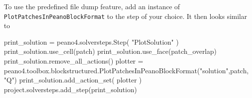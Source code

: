 To use the predefined file dump feature, add an instance of \linebreak
\texttt{PlotPatchesInPeanoBlockFormat} to the step of your choice. 
It then looks similar to
\begin{code}
print_solution = peano4.solversteps.Step( "PlotSolution" )
print_solution.use_cell(patch)
print_solution.use_face(patch_overlap)
print_solution.remove_all_actions()
plotter = peano4.toolbox.blockstructured.PlotPatchesInPeanoBlockFormat("solution",patch,"Q")
print_solution.add_action_set( plotter )
project.solversteps.add_step(print_solution)
\end{code}





